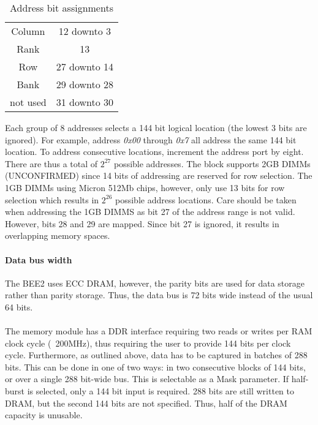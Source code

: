 \documentclass{article}
\begin{document}
{\begin{table*}[h]
\begin{tabular}{|c|c|}
			Column 			&		12 downto 3	\\

			Rank 				&		13					\\

			Row 				&		27 downto 14	\\

			Bank 				&		29 downto 28	\\

			not used 		&		31 downto 30	\\

			\hline

		\end{tabular}

	\caption{Address bit assignments}

	\label{tab:AddressBitAssignments}

\end{table*}





Each group of 8 addresses selects a 144 bit logical location (the lowest 3 bits are ignored). For example, address \textit{0x00} through \textit{0x7} all address the same 144 bit location. To address consecutive locations, increment the address port by eight. There are thus a total of $2^{27}$ possible addresses. The block supports 2GB DIMMs (UNCONFIRMED) since 14 bits of addressing are reserved for row selection. The 1GB DIMMs using Micron 512Mb chips, however, only use 13 bits for row selection which results in $2^{26}$ possible address locations. Care should be taken when addressing the 1GB DIMMS as bit 27 of the address range is not valid. However, bits 28 and 29 are mapped. Since bit 27 is ignored, it results in overlapping memory spaces.



\paragraph{Data bus width}

The BEE2 uses ECC DRAM, however, the parity bits are used for data storage rather than parity storage. Thus, the data bus is 72 bits wide instead of the usual 64 bits.

\paragraph{}

The memory module has a DDR interface requiring two reads or writes per RAM clock cycle (~200MHz), thus requiring the user to provide 144 bits per clock cycle. Furthermore, as outlined above, data has to be captured in batches of 288 bits. This can be done in one of two ways: in two consecutive blocks of 144 bits, or over a single 288 bit-wide bus. This is selectable as a Mask parameter. If half-burst is selected, only a 144 bit input is required. 288 bits are still written to DRAM, but the second 144 bits are not specified. Thus, half of the DRAM capacity is unusable.



}
\end{document}
